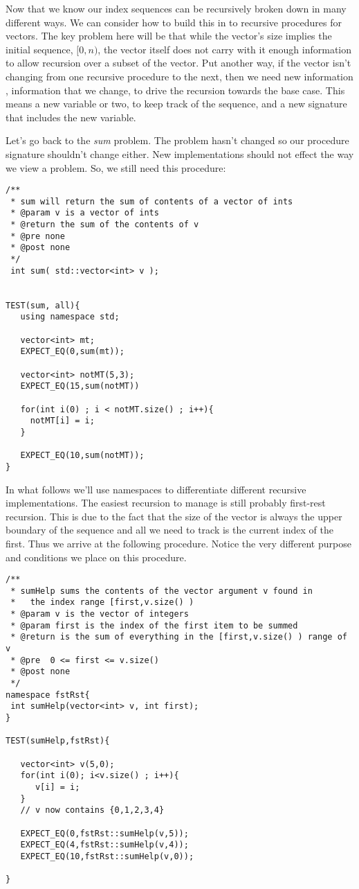 \documentclass[]{tufte-handout}
\begin{document}
Now that we know our index sequences can be recursively broken down in many different ways.  We can consider how to build this in to recursive procedures for vectors. The key problem here will be that while the vector's size implies the initial sequence, $[0,n)$, the vector itself does not carry with it enough information to allow recursion over a subset of the vector.  Put another way, if the vector isn't changing from one recursive procedure to the next, then we need new information , information that we change, to drive the recursion towards the base case. This means a new variable or two, to keep track of the sequence, and a new signature that includes the new variable.  

Let's go back to the \textit{sum} problem. The problem hasn't changed so our procedure signature shouldn't change either.  New implementations should not effect the way we view a problem. So, we still need this procedure:
\begin{verbatim}
/**
 * sum will return the sum of contents of a vector of ints
 * @param v is a vector of ints
 * @return the sum of the contents of v
 * @pre none
 * @post none
 */
 int sum( std::vector<int> v );


TEST(sum, all){
   using namespace std;  
   
   vector<int> mt;
   EXPECT_EQ(0,sum(mt));
   
   vector<int> notMT(5,3);
   EXPECT_EQ(15,sum(notMT))

   for(int i(0) ; i < notMT.size() ; i++){
     notMT[i] = i;
   }
   
   EXPECT_EQ(10,sum(notMT));
}
\end{verbatim}

In what follows we'll use namespaces to differentiate different recursive implementations. The easiest recursion to manage is still probably first-rest recursion. This is due to the fact that the size of the vector is always the upper boundary of the sequence and all we need to track is the current index of the first. Thus we arrive at the following procedure. Notice the very different purpose and conditions we place on this procedure.
\begin{verbatim}
/**
 * sumHelp sums the contents of the vector argument v found in
 *   the index range [first,v.size() )
 * @param v is the vector of integers
 * @param first is the index of the first item to be summed
 * @return is the sum of everything in the [first,v.size() ) range of v
 * @pre  0 <= first <= v.size()
 * @post none
 */
namespace fstRst{
 int sumHelp(vector<int> v, int first);
} 

TEST(sumHelp,fstRst){

   vector<int> v(5,0);
   for(int i(0); i<v.size() ; i++){
      v[i] = i;		   
   }
   // v now contains {0,1,2,3,4}
   
   EXPECT_EQ(0,fstRst::sumHelp(v,5));
   EXPECT_EQ(4,fstRst::sumHelp(v,4));
   EXPECT_EQ(10,fstRst::sumHelp(v,0));
   
}
\end{verbatim}
\end{document}
